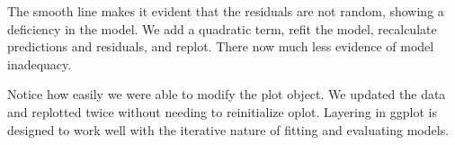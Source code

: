 % 
% 


The smooth line makes it evident that the residuals are not random, showing a deficiency in the model.  We add a quadratic term, refit the model, recalculate predictions and residuals, and replot.  There now much less evidence of model inadequacy.

% 
% 


Notice how easily we were able to modify the plot object.  We updated the data and replotted twice without needing to reinitialize oplot.  Layering in ggplot is designed to work well with the iterative nature of fitting and evaluating models.


